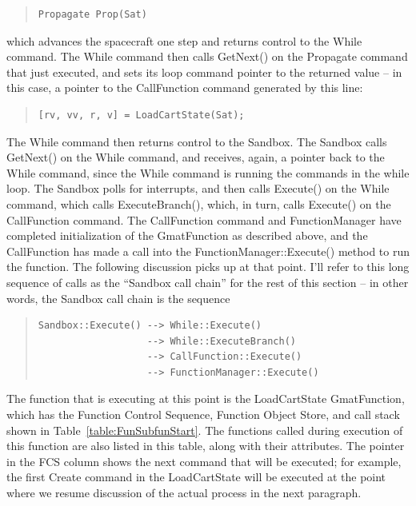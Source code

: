 \begin{quote}
\begin{verbatim}
Propagate Prop(Sat)
\end{verbatim}
\end{quote}

\noindent which advances the spacecraft one step and returns control to the While command.  The
While command then calls GetNext() on the Propagate command that just executed, and sets its loop
command pointer to the returned value -- in this case, a pointer to the CallFunction command
generated by this line:

\begin{quote}
\begin{verbatim}
[rv, vv, r, v] = LoadCartState(Sat);
\end{verbatim}
\end{quote}

\noindent The While command then returns control to the Sandbox.  The Sandbox calls GetNext() on the
While command, and receives, again, a pointer back to the While command, since the While command is
running the commands in the while loop.  The Sandbox polls for interrupts, and then calls Execute()
on the While command, which calls ExecuteBranch(), which, in turn, calls Execute() on the
CallFunction command.  The CallFunction command and FunctionManager have completed initialization
of the GmatFunction as described above, and the CallFunction has made a call into the
FunctionManager::\-Execute() method to run the function. The following discussion picks up at that
point.  I'll refer to this long sequence of calls as the ``Sandbox call chain'' for the rest of this
section -- in other words, the Sandbox call chain is the sequence

\begin{quote}
\begin{verbatim}
Sandbox::Execute() --> While::Execute()
                   --> While::ExecuteBranch()
                   --> CallFunction::Execute()
                   --> FunctionManager::Execute()
\end{verbatim}
\end{quote}

The function that is executing at this point is the LoadCartState GmatFunction, which has the
Function Control Sequence, Function Object Store, and call stack shown in
Table~\ref{table:FunSubfunStart}.  The functions called during execution of this function are also
listed in this table, along with their attributes. The pointer in the FCS column shows the next
command that will be executed; for example, the first Create command in the LoadCartState will be
executed at the point where we resume discussion of the actual process in the next paragraph.

